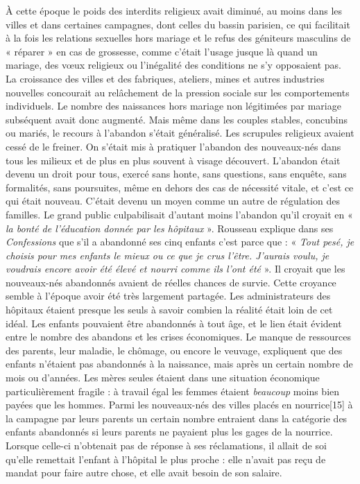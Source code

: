 À cette époque le poids des interdits religieux avait diminué, au moins dans les villes et dans certaines campagnes, dont celles du bassin parisien, ce qui facilitait à la fois les relations sexuelles hors mariage et le refus des géniteurs masculins de « réparer » en cas de grossesse, comme c'était l'usage jusque là quand un mariage, des vœux religieux ou l'inégalité des conditions ne s'y opposaient pas. La croissance des villes et des fabriques, ateliers, mines et autres industries nouvelles concourait au relâchement de la pression sociale sur les comportements individuels. Le nombre des naissances hors mariage non légitimées par mariage subséquent avait donc augmenté. 
 Mais même dans les couples stables, concubins ou mariés, le recours à l'abandon s'était généralisé. Les scrupules religieux avaient cessé de le freiner. On s'était mis à pratiquer l'abandon des nouveaux-nés dans tous les milieux et de plus en plus souvent à visage découvert. L'abandon était devenu un droit pour tous, exercé sans honte, sans questions, sans enquête, sans formalités, sans poursuites, même en dehors des cas de nécessité vitale, et c'est ce qui était nouveau. C'était devenu un moyen comme un autre de régulation des familles. 
 Le grand public culpabilisait d'autant moins l'abandon qu'il croyait en « \emph{la bonté de l'éducation donnée par les hôpitaux} ». Rousseau explique dans ses \emph{Confessions} que s'il a abandonné ses cinq enfants c'est parce que : « \emph{Tout pesé, je choisis pour mes enfants le mieux ou ce que je crus l'être. J'aurais voulu, je voudrais encore avoir été élevé et nourri comme ils l'ont été} ». Il croyait que les nouveaux-nés abandonnés avaient de réelles chances de survie. Cette croyance semble à l'époque avoir été très largement partagée. Les administrateurs des hôpitaux étaient presque les seuls à savoir combien la réalité était loin de cet idéal. 
 Les enfants pouvaient être abandonnés à tout âge, et le lien était évident entre le nombre des abandons et les crises économiques. Le manque de ressources des parents, leur maladie, le chômage, ou encore le veuvage, expliquent que des enfants n'étaient pas abandonnés à la naissance, mais après un certain nombre de mois ou d'années. Les mères seules étaient dans une situation économique particulièrement fragile : à travail égal les femmes étaient \emph{beaucoup} moins bien payées que les hommes. 
 Parmi les nouveaux-nés des villes placés en nourrice[15] à la campagne par leurs parents un certain nombre entraient dans la catégorie des enfants abandonnés si leurs parents ne payaient plus les gages de la nourrice. Lorsque celle-ci n'obtenait pas de réponse à ses réclamations, il allait de soi qu'elle remettait l'enfant à l'hôpital le plus proche : elle n'avait pas reçu de mandat pour faire autre chose, et elle avait besoin de son salaire. 
